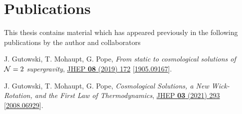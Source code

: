 \begingroup
\let\clearpage\relax
\let\cleardoublepage\relax
\let\cleardoublepage\relax

\chapter*{Publications}

This thesis contains material which has appeared previously in the following publications by the author and collaborators

\begin{enumerate}[ {[}1{]} ]
  \item J. Gutowski, T. Mohaupt, G. Pope, \emph{From static to cosmological solutions of ${\cal N} = 2$ supergravity}, \href{https://doi.org/10.1007/jhep08(2019)172}{JHEP \textbf{08} (2019) 172}
  [\href{https://arxiv.org/abs/1905.09167}{1905.09167}].
  \item J. Gutowski, T. Mohaupt, G. Pope, \emph{Cosmological Solutions, a New Wick-Rotation, and the First Law of Thermodynamics}, \href{https://doi.org/10.1007/JHEP03(2021)293}{JHEP \textbf{03} (2021) 293}
  [\href{https://arxiv.org/abs/2008.06929}{2008.06929}].
\end{enumerate}


\endgroup			

\vfill